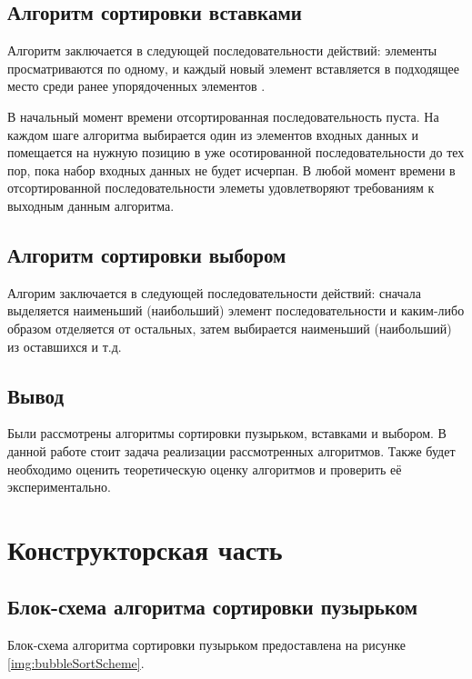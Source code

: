 \documentclass[12pt]{report}
\begin{document}
\section{Алгоритм сортировки вставками}
Алгоритм заключается в следующей последовательности действий: элементы просматриваются по одному, и каждый новый элемент вставляется в подходящее место среди ранее упорядоченных элементов \cite{Knut}.

В начальный момент времени отсортированная последовательность пуста. На каждом шаге алгоритма выбирается один из элементов входных данных и помещается на нужную позицию в уже осотированной последовательности до тех пор, пока набор входных данных не будет исчерпан. В любой момент времени в отсортированной последовательности элеметы удовлетворяют требованиям к выходным данным алгоритма.

\section{Алгоритм сортировки выбором}
Алгорим заключается в следующей последовательности действий: сначала выделяется наименьший (наибольший) элемент последовательности и каким-либо образом отделяется от остальных, затем выбирается наименьший (наибольший) из оставшихся и т.д. \cite{Knut}

\section*{Вывод}
Были рассмотрены алгоритмы сортировки пузырьком, вставками и выбором. В данной работе стоит задача реализации рассмотренных алгоритмов. Также будет необходимо оценить теоретическую оценку алгоритмов и проверить её экспериментально.

\chapter{Конструкторская часть}
\section{Блок-схема алгоритма сортировки пузырьком}
Блок-схема алгоритма сортировки пузырьком предоставлена на рисунке \ref{img:bubbleSortScheme}.
\end{document}
